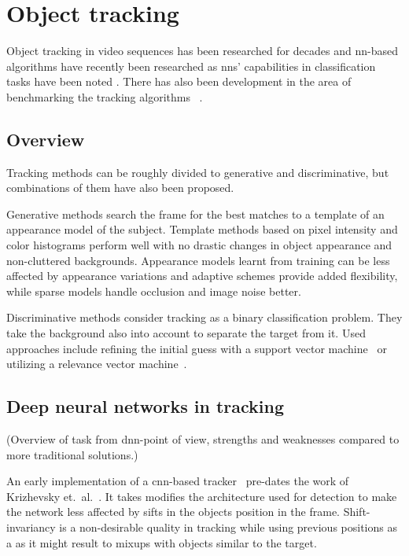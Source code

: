 \section{Object tracking}
Object tracking in video sequences has been researched for decades and \ac{nn}-based
algorithms have recently been researched  as \ac{nn}s'
capabilities in classification tasks have been noted .
There has also been development in the area of benchmarking the tracking algorithms
~\cite{OT_BENCH}.

\subsection{Overview}
Tracking methods can be roughly divided to generative and discriminative, but combinations
of them have also been proposed.

Generative methods search the frame for the best matches to a template of an appearance
model of the subject. Template methods based on pixel intensity and color histograms
perform well with no drastic changes in object appearance and non-cluttered backgrounds.
Appearance models learnt from training can be less affected by appearance variations and
adaptive schemes provide added flexibility, while sparse models handle occlusion and
image noise better.~\cite{OBJECT_PLS}

Discriminative methods consider tracking as a binary classification problem. They take
the background also into account to separate the target from it. Used approaches
include refining the initial guess with a support vector machine~\cite{SVT} or utilizing
a relevance vector machine~\cite{SPARSE_BAYESIAN}.

\subsection{Deep neural networks in tracking}
(Overview of task from \ac{dnn}-point of view, strengths and weaknesses compared to
more traditional solutions.)

An early implementation of a \ac{cnn}-based tracker~\cite{HUMAN_CNN} pre-dates the work
of Krizhevsky et.~al.~\cite{NIPS_IMAGENET}. It takes modifies the architecture used for
detection to make the network less affected by sifts in the objects position in the
frame. Shift-invariancy is a non-desirable quality in tracking while using previous
positions as a as it might result to mixups with objects similar to the target.~\cite{HUMAN_CNN}

